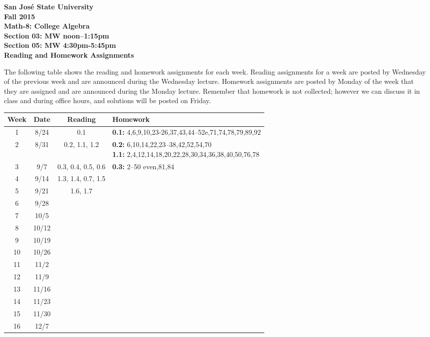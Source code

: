\documentclass[letterpaper, 12pt]{article}
\begin{document}
\begin{center}
\bfseries
San Jos\'{e} State University \\
Fall 2015 \\
Math-8: College Algebra \\
Section 03: MW noon--1:15pm \\
Section 05: MW 4:30pm-5:45pm \\
\bigskip
Reading and Homework Assignments
\end{center}

\bigskip

The following table shows the reading and homework assignments for each week.
Reading assignments for a week are posted by Wednesday of the previous week and
are announced during the Wednesday lecture.  Homework assignments are posted by
Monday of the week that they are assigned and are announced during the Monday
lecture.  Remember that homework is not collected; however we can discuss it in
class and during office hours, and solutions will be posted on Friday.

\bigskip

\begin{tabular}{|c|c|c|l|}
\hline
Week & Date & Reading & Homework \\
\hline
1 & 8/24 & 0.1 & \textbf{0.1:}
  4,6,9,10,23-26,37,43,44--52e,71,74,78,79,89,92 \\
\hline
2 & 8/31 & 0.2, 1.1, 1.2 & 
\shortstack[l]{\textbf{0.2:} 6,10,14,22,23--38,42,52,54,70 \\
  \textbf{1.1:} 2,4,12,14,18,20,22,28,30,34,36,38,40,50,76,78} \\
\hline
3 & 9/7 & 0.3, 0.4, 0.5, 0.6 & \textbf{0.3:} 2--50 even,81,84 \\
\hline
4 & 9/14 & 1.3, 1.4, 0.7, 1.5 & \\
\hline
5 & 9/21 & 1.6, 1.7 & \\
\hline
6 & 9/28 & & \\
\hline
7 & 10/5 & & \\
\hline
8 & 10/12 & & \\
\hline
9 & 10/19 & & \\
\hline
10 & 10/26 & & \\
\hline
11 & 11/2 & & \\
\hline
12 & 11/9 & & \\
\hline
13 & 11/16 & & \\
\hline
14 & 11/23 & & \\
\hline
15 & 11/30 & & \\
\hline
16 & 12/7 & & \\
\hline
\end{tabular}
\end{document}
